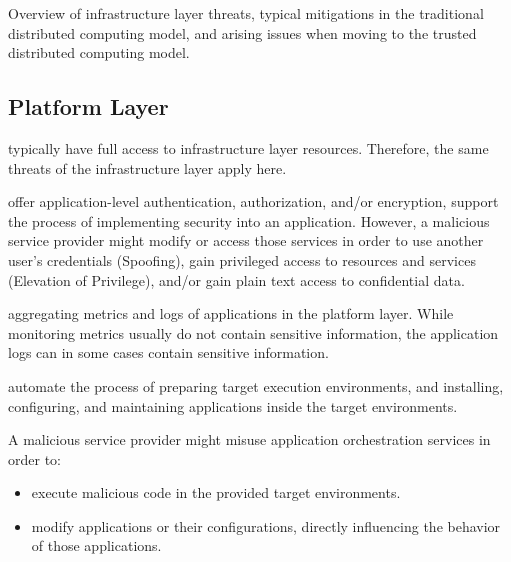 \begin{table}[H]
  \centering
  \scriptsize
  
  \caption{Overview of infrastructure layer threats, typical mitigations in the traditional distributed computing model, and arising issues when moving to the trusted distributed computing model.}
  \label{table:threats-overview}
\end{table}

\subsection{Platform Layer}

\begin{description}[style=standard]
  \item[Infrastructure management services] typically have full access to
    infrastructure layer resources. Therefore, the same threats of the
    infrastructure layer apply here.

  \item[Security services] offer application-level authentication,
    authorization, and/or encryption, support the process of implementing
    security into an application. However, a malicious service provider might
    modify or access those services in order to use another user's credentials
    (Spoofing), gain privileged access to resources and services (Elevation of
    Privilege), and/or gain plain text access to confidential data.

  \item[Monitoring and Logging services] aggregating metrics and logs of
    applications in the platform layer. While monitoring metrics usually do not
    contain sensitive information, the application logs can in some cases
    contain sensitive information.

  \item[Application orchestration services] automate the process of preparing
    target execution environments, and installing, configuring, and maintaining
    applications inside the target environments.
    
    A malicious service provider might misuse application orchestration services
    in order to:

    \begin{itemize}
      \item execute malicious code in the provided target environments.
      \item modify applications or their configurations, directly influencing
            the behavior of those applications.
    \end{itemize}
\end{description}

